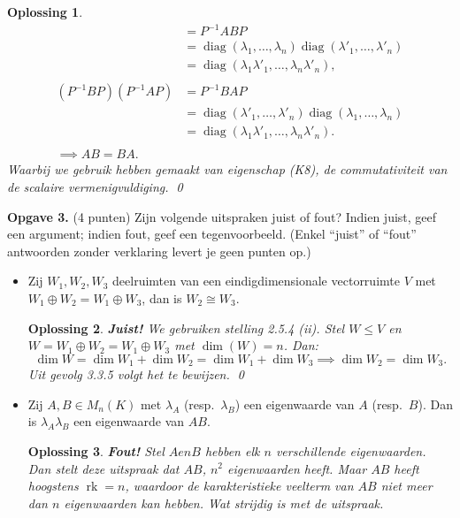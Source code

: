 \documentclass[a4paper,12pt]{article}
\newtheorem{oplossing}{Oplossing}
\begin{document}
\begin{enumerate}
\begin{itemize}
\begin{oplossing}
\begin{align*}
            &= P^{-1} AB P\\
            &=  \operatorname{diag}(\lambda_1,\dots,\lambda_n)  \operatorname{diag}(\lambda'_1,\dots,\lambda'_n)\\
            &= \operatorname{diag}(\lambda_1\lambda'_1,\dots,\lambda_n\lambda'_n),\\
            \\
            (P^{-1} B P)(P^{-1} A P) 
            &= P^{-1} BA P\\
            &=  \operatorname{diag}(\lambda'_1,\dots,\lambda'_n)  \operatorname{diag}(\lambda_1,\dots,\lambda_n)\\
            &= \operatorname{diag}(\lambda_1\lambda'_1,\dots,\lambda_n\lambda'_n). \\
            \\
            \implies AB=BA.
        \end{align*}
        Waarbij we gebruik hebben gemaakt van eigenschap (K8), de commutativiteit van de scalaire vermenigvuldiging. \qed
    \end{oplossing}
\end{itemize}

\vspace{0.5cm}

\textbf{Opgave 3.} (4 punten) Zijn volgende uitspraken juist of fout? Indien juist, geef een argument; indien fout, geef een tegenvoorbeeld. (Enkel ``juist'' of ``fout'' antwoorden zonder verklaring levert je geen punten op.)
\begin{itemize}
    \item[(i)] Zij $W_1, W_2, W_3$ deelruimten van een eindigdimensionale vectorruimte $V$ met $W_1 \oplus W_2 = W_1 \oplus W_3$, dan is $W_2 \cong W_3$.
    \begin{oplossing}
        \textbf{Juist!}
        We gebruiken stelling 2.5.4 (ii). Stel \(W \le V\) en \(W = W_1 \oplus W_2 = W_1 \oplus W_3\) met \(\dim(W) = n\).
        Dan:
        \[
        \dim W = \dim W_1 + \dim W_2 = \dim W_1 + \dim W_3 \implies \dim W_2 = \dim W_3.
        \]
        Uit gevolg 3.3.5 volgt het te bewijzen. \qed
    \end{oplossing}
    \item[(ii)] Zij $A, B \in M_n(K)$ met $\lambda_A$ (resp.\ $\lambda_B$) een eigenwaarde van $A$ (resp.\ $B$). Dan is $\lambda_A \lambda_B$ een eigenwaarde van $AB$.
    \begin{oplossing}
        \textbf{Fout!} Stel \(A en B\) hebben elk \(n\) verschillende eigenwaarden. Dan stelt deze uitspraak dat \(AB\), \(n^2\) eigenwaarden heeft.
        Maar \(AB\) heeft hoogstens \(\operatorname{rk}=n\), waardoor de karakteristieke veelterm van \(AB\) niet meer dan \(n\) eigenwaarden kan hebben.
        Wat strijdig is met de uitspraak. 


\end{oplossing}
\end{itemize}
\end{enumerate}
\end{document}
